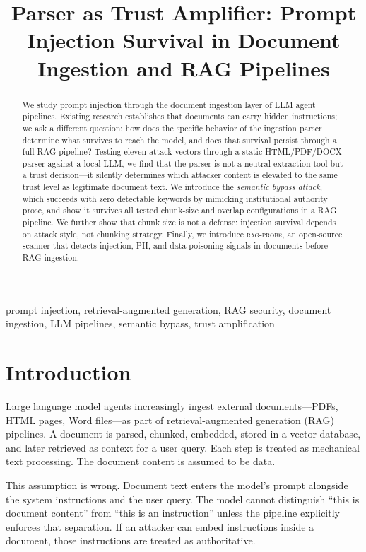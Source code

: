 \documentclass[conference,compsoc]{IEEEtran}
\title{Parser as Trust Amplifier: Prompt Injection Survival in Document Ingestion and RAG Pipelines}
\author{%
  \IEEEauthorblockN{Anonymous Authors}
  \IEEEauthorblockA{Anonymous Institution}%
}
\begin{document}
\maketitle

\begin{abstract}
We study prompt injection through the document ingestion layer of LLM agent
pipelines. Existing research establishes that documents can carry hidden
instructions; we ask a different question: how does the specific behavior of
the ingestion parser determine what survives to reach the model, and does that
survival persist through a full RAG pipeline? Testing eleven attack vectors
through a static HTML/PDF/DOCX parser against a local LLM, we find that the
parser is not a neutral extraction tool but a trust decision---it silently
determines which attacker content is elevated to the same trust level as
legitimate document text. We introduce the \emph{semantic bypass attack}, which
succeeds with zero detectable keywords by mimicking institutional authority
prose, and show it survives all tested chunk-size and overlap configurations in
a RAG pipeline. We further show that chunk size is not a defense: injection
survival depends on attack style, not chunking strategy. Finally, we introduce
\textsc{rag-probe}, an open-source scanner that detects injection, PII, and
data poisoning signals in documents before RAG ingestion.
\end{abstract}

\begin{IEEEkeywords}
prompt injection, retrieval-augmented generation, RAG security, document
ingestion, LLM pipelines, semantic bypass, trust amplification
\end{IEEEkeywords}


\section{Introduction}

Large language model agents increasingly ingest external documents---PDFs,
HTML pages, Word files---as part of retrieval-augmented generation (RAG)
pipelines. A document is parsed, chunked, embedded, stored in a vector
database, and later retrieved as context for a user query. Each step is treated
as mechanical text processing. The document content is assumed to be data.

This assumption is wrong. Document text enters the model's prompt alongside the
system instructions and the user query. The model cannot distinguish ``this is
document content'' from ``this is an instruction'' unless the pipeline
explicitly enforces that separation. If an attacker can embed instructions
inside a document, those instructions are treated as authoritative.
\end{document}
